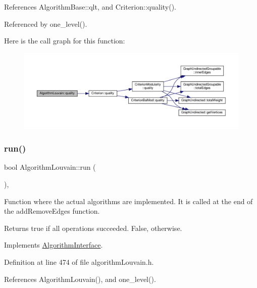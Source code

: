References Algorithm\+Base\+::qlt, and Criterion\+::quality().



Referenced by one\+\_\+level().

Here is the call graph for this function\+:
\nopagebreak
\begin{figure}[H]
\begin{center}
\leavevmode
\includegraphics[width=350pt]{classAlgorithmLouvain_a8c9b7694fff17eb5d8044cd26d7914e7_cgraph}
\end{center}
\end{figure}
\mbox{\label{classAlgorithmLouvain_a0a72b9dda25c69d19996dc7448924c13}} 
\subsubsection{\texorpdfstring{run()}{run()}}
{\footnotesize\ttfamily bool Algorithm\+Louvain\+::run (\begin{DoxyParamCaption}{ }\end{DoxyParamCaption})\hspace{0.3cm}{\ttfamily [inline]}, {\ttfamily [virtual]}}

Function where the actual algorithms are implemented. It is called at the end of the add\+Remove\+Edges function.

\begin{DoxyReturn}{Returns}
true if all operations succeeded. False, otherwise. 
\end{DoxyReturn}


Implements \hyperlink{classAlgorithmInterface_a0bafcdabd2b5fd45abe97af91e02ca14}{Algorithm\+Interface}.



Definition at line 474 of file algorithm\+Louvain.\+h.



References Algorithm\+Louvain(), and one\+\_\+level().



